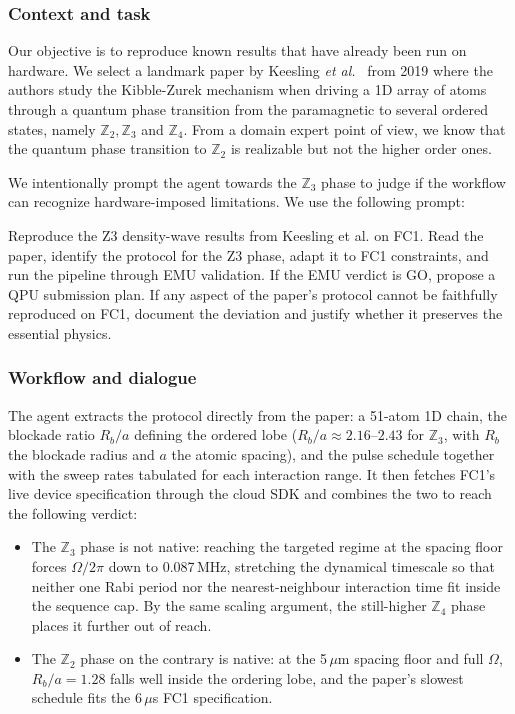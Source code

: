 \documentclass[aps,pra,reprint,amssymb,superscriptaddress,nofootinbib,floatfix]{revtex4-2}
\begin{document}
\subsubsection{Context and task}

Our objective is to reproduce known results that have already been run on hardware. We select a landmark paper by Keesling \textit{et al.}~\cite{keesling2019quantum} from 2019 where the authors study the Kibble-Zurek mechanism when driving a 1D array of atoms through a quantum phase transition from the paramagnetic to several ordered states, namely $\mathbb{Z}_2, \mathbb{Z}_3$ and $\mathbb{Z}_4$. From a domain expert point of view, we know that the quantum phase transition to $\mathbb{Z}_2$ is realizable but not the higher order ones. 

We intentionally prompt the agent towards the $\mathbb{Z}_3$ phase to judge if the workflow can recognize hardware-imposed limitations. We use the following prompt:

\begin{promptbox}[title={Agent Prompt}]
Reproduce the Z3 density-wave results from Keesling et al. on FC1. Read the paper, identify the protocol for the Z3 phase, adapt it to FC1 constraints, and run the pipeline through EMU validation. If the EMU verdict is GO, propose a QPU submission plan. If any aspect of the paper's protocol cannot be faithfully reproduced on FC1, document the deviation and justify whether it preserves the essential physics.
\end{promptbox}



\subsubsection{Workflow and dialogue}

The agent extracts the protocol directly from the paper: a 51-atom 1D chain, the
blockade ratio $R_b/a$ defining the ordered lobe ($R_b/a \approx 2.16$--$2.43$ for
$\mathbb{Z}_3$, with $R_b$ the blockade radius and $a$ the atomic spacing), and the pulse schedule together with the sweep rates tabulated for each interaction range. It then fetches FC1's live device specification through the cloud SDK and combines the two to reach the following verdict:

\begin{itemize}
    \item[\textit{(i)}] The $\mathbb{Z}_3$ phase is not native: reaching the targeted regime at the spacing floor forces $\Omega/2\pi$ down to 0.087\,MHz, stretching the dynamical timescale so that neither one Rabi period nor the nearest-neighbour interaction time fit inside the sequence cap. By the same scaling argument, the still-higher $\mathbb{Z}_4$ phase places it further out of reach.
    \item[\textit{(ii)}] The $\mathbb{Z}_2$ phase on the contrary is native: at the 5\,$\mu$m spacing floor and full $\Omega$, $R_b/a = 1.28$ falls well inside the ordering lobe, and the paper's slowest schedule fits the 6\,$\mu$s FC1 specification.
\end{itemize}
\end{document}

